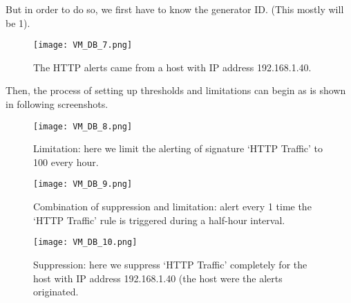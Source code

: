 But in order to do so, we first have to know the generator ID. (This mostly will be 1).

\begin{figure}[h]
    \centering
    \texttt{[image: VM\_DB\_7.png]}
    \caption{The HTTP alerts came from a host with IP address 192.168.1.40.}
\end{figure}

Then, the process of setting up thresholds and limitations can begin as is shown in following screenshots.

\begin{figure}[h]
    \centering
    \texttt{[image: VM\_DB\_8.png]}
    \caption{Limitation: here we limit the alerting of signature `HTTP Traffic' to 100 every hour.}
\end{figure}

\begin{figure}[h]
    \centering
    \texttt{[image: VM\_DB\_9.png]}
    \caption{Combination of suppression and limitation: alert every 1 time the `HTTP Traffic' rule is triggered during a half-hour interval.}
\end{figure}

\begin{figure}[h]
    \centering
    \texttt{[image: VM\_DB\_10.png]}
    \caption{Suppression: here we suppress `HTTP Traffic' completely for the host with IP address 192.168.1.40 (the host were the alerts originated.}
\end{figure}











